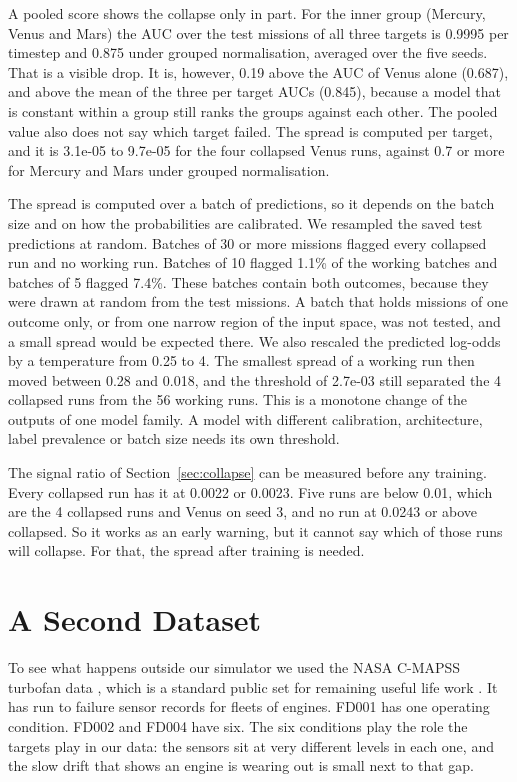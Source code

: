 \documentclass[preprint,12pt,authoryear,doubleblind]{elsarticle}
\begin{document}
A pooled score shows the collapse only in part. For the inner group (Mercury, Venus and Mars) the AUC over the test missions of all three targets is 0.9995 per timestep and 0.875 under grouped normalisation, averaged over the five seeds. That is a visible drop. It is, however, 0.19 above the AUC of Venus alone (0.687), and above the mean of the three per target AUCs (0.845), because a model that is constant within a group still ranks the groups against each other. The pooled value also does not say which target failed. The spread is computed per target, and it is 3.1e-05 to 9.7e-05 for the four collapsed Venus runs, against 0.7 or more for Mercury and Mars under grouped normalisation.

The spread is computed over a batch of predictions, so it depends on the batch size and on how the probabilities are calibrated. We resampled the saved test predictions at random. Batches of 30 or more missions flagged every collapsed run and no working run. Batches of 10 flagged 1.1\% of the working batches and batches of 5 flagged 7.4\%. These batches contain both outcomes, because they were drawn at random from the test missions. A batch that holds missions of one outcome only, or from one narrow region of the input space, was not tested, and a small spread would be expected there. We also rescaled the predicted log-odds by a temperature from 0.25 to 4. The smallest spread of a working run then moved between 0.28 and 0.018, and the threshold of 2.7e-03 still separated the 4 collapsed runs from the 56 working runs. This is a monotone change of the outputs of one model family. A model with different calibration, architecture, label prevalence or batch size needs its own threshold.

The signal ratio of Section~\ref{sec:collapse} can be measured before any training. Every collapsed run has it at 0.0022 or 0.0023. Five runs are below 0.01, which are the 4 collapsed runs and Venus on seed 3, and no run at 0.0243 or above collapsed. So it works as an early warning, but it cannot say which of those runs will collapse. For that, the spread after training is needed.

\section{A Second Dataset}
\label{sec:second}

To see what happens outside our simulator we used the NASA C-MAPSS turbofan data \citep{saxena2008}, which is a standard public set for remaining useful life work \citep{li2018rul}. It has run to failure sensor records for fleets of engines. FD001 has one operating condition. FD002 and FD004 have six. The six conditions play the role the targets play in our data: the sensors sit at very different levels in each one, and the slow drift that shows an engine is wearing out is small next to that gap.
\end{document}
